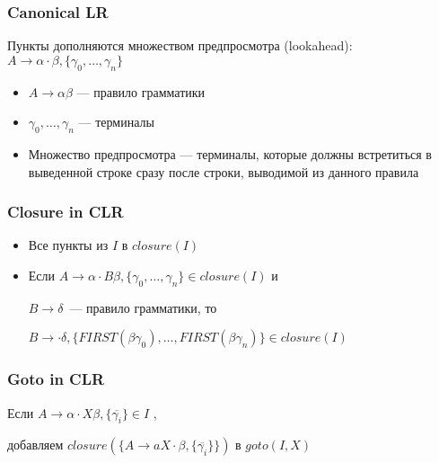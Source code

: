 \documentclass{beamer}
\newcommand{\clritem}[4]{#1 \to #2 \cdot #3, \{#4\}}
\begin{document}
\begin{frame}[fragile]
  \transwipe[direction=90]
  \frametitle{Canonical LR}

\begin{center}
  Пункты дополняются множеством предпросмотра (lookahead): $\clritem{A}{\alpha}{\beta}{\gamma_0, \dots, \gamma_n}$
\end{center}

\begin{itemize}
  \item $A \to \alpha \beta$ --- правило грамматики
  \item $\gamma_0, \dots, \gamma_n$ --- терминалы
  \item Множество предпросмотра --- терминалы, которые должны встретиться в выведенной строке сразу после строки, выводимой из данного правила 
\end{itemize}
\end{frame}

\begin{frame}[fragile]
  \transwipe[direction=90]
  \frametitle{Closure in CLR}
  \begin{itemize}
    \item Все пункты из $I$ в $closure(I)$
    \item Если $\clritem{A}{\alpha}{B \beta}{\gamma_0, \dots, \gamma_n} \in closure(I)$ и 
    
    $B \to \delta$~--- правило грамматики, то
    
    $\clritem{B}{}{\delta}{FIRST(\beta \gamma_0), \dots, FIRST(\beta \gamma_n)} \in closure(I)$
  \end{itemize}
\end{frame}

\begin{frame}[fragile]
  \transwipe[direction=90]
  \frametitle{Goto in CLR}
  \begin{center}
    Если $\clritem{A}{\alpha}{X \beta}{\overline{\gamma_i}} \in I$ , 
    
    добавляем $closure(\{ \clritem{A}{aX}{\beta}{\overline{\gamma_i}} \})$ в $goto(I, X)$
  \end{center}
\end{frame}
\end{document}

